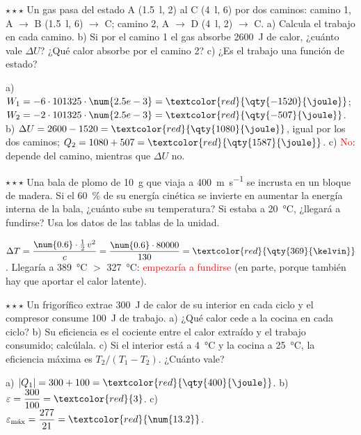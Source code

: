 \begin{exercise}
    \(\star\star\star\) Un gas pasa del estado A (\qty{1.5}{\litre}, \qty{2}{\atm}) al C (\qty{4}{\litre}, \qty{6}{\atm}) por dos
    caminos: camino 1, A \(\rightarrow\) B (\qty{1.5}{\litre}, \qty{6}{\atm}) \(\rightarrow\) C; camino 2, A \(\rightarrow\) D
    (\qty{4}{\litre}, \qty{2}{\atm}) \(\rightarrow\) C. a) Calcula el trabajo en cada camino. b) Si por el camino 1 el gas absorbe
    \qty{2600}{\joule} de calor, ¿cuánto vale \(\Delta U\)? ¿Qué calor absorbe por el camino 2? c) ¿Es el trabajo una función de
    estado?
    \begin{solu}
        a) \(W_1 = -6 \cdot 101325 \cdot \num{2.5e-3} = \textcolor{red}{\qty{-1520}{\joule}}\); \(W_2 = -2 \cdot 101325 \cdot \num{2.5e-3} =
        \textcolor{red}{\qty{-507}{\joule}}\). b) \(\Delta U = 2600 - 1520 = \textcolor{red}{\qty{1080}{\joule}}\), igual por los dos
        caminos; \(Q_2 = 1080 + 507 = \textcolor{red}{\qty{1587}{\joule}}\). c) \textcolor{red}{No}: depende del camino, mientras que
        \(\Delta U\) no.
    \end{solu}
\end{exercise}

\begin{exercise}
    \(\star\star\star\) Una bala de plomo de \qty{10}{\g} que viaja a \qty{400}{\m\per\s} se incrusta en un bloque de madera. Si el
    \qty{60}{\percent} de su energía cinética se invierte en aumentar la energía interna de la bala, ¿cuánto sube su temperatura?
    Si estaba a \qty{20}{\degreeCelsius}, ¿llegará a fundirse? Usa los datos de las tablas de la unidad.
    \begin{solu}
        \(\Delta T = \dfrac{\num{0.6} \cdot \frac{1}{2}\,v^2}{c} = \dfrac{\num{0.6} \cdot 80000}{130} = \textcolor{red}{\qty{369}{\kelvin}}\).
        Llegaría a \qty{389}{\degreeCelsius} \(>\) \qty{327}{\degreeCelsius}: \textcolor{red}{empezaría a fundirse} (en parte, porque
        también hay que aportar el calor latente).
    \end{solu}
\end{exercise}

\begin{exercise}
    \(\star\star\star\) Un frigorífico extrae \qty{300}{\joule} de calor de su interior en cada ciclo y el compresor consume
    \qty{100}{\joule} de trabajo. a) ¿Qué calor cede a la cocina en cada ciclo? b) Su eficiencia es el cociente entre el calor extraído
    y el trabajo consumido; calcúlala. c) Si el interior está a \qty{4}{\degreeCelsius} y la cocina a \qty{25}{\degreeCelsius}, la
    eficiencia máxima es \(T_2/(T_1 - T_2)\). ¿Cuánto vale?
    \begin{solu}
        a) \(|Q_1| = 300 + 100 = \textcolor{red}{\qty{400}{\joule}}\). b) \(\varepsilon = \dfrac{300}{100} = \textcolor{red}{3}\). c)
        \(\varepsilon_{\text{máx}} = \dfrac{277}{21} = \textcolor{red}{\num{13.2}}\).
    \end{solu}
\end{exercise}


